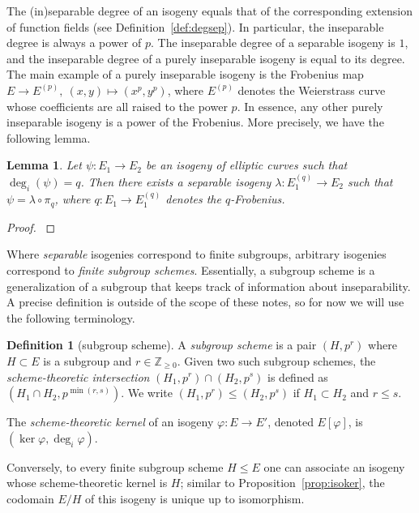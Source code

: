 \documentclass[10pt]{article}
\theoremstyle{plain}
\newtheorem{lemma}[theorem]{Lemma}
\theoremstyle{definition}
\newtheorem{definition}[theorem]{Definition}
\def\Z{\ensuremath{\mathbb{Z}}}
\begin{document}
The (in)separable degree of an isogeny equals that of 
the corresponding extension of function fields
(see Definition~\ref{def:degsep}).
In particular, the inseparable degree is always a power of $p$.
The inseparable degree of a separable isogeny is $1$,
and the inseparable degree of a purely inseparable isogeny is equal
to its degree.
The main example of a purely inseparable isogeny is the Frobenius map
$E\to E^{(p)},\:(x,y)\mapsto (x^p,y^p)$, where $E^{(p)}$ denotes the
Weierstrass curve whose coefficients are all raised to the power $p$.
In essence, any other purely inseparable isogeny is a power of the
Frobenius. More precisely, we have the following lemma.

\begin{lemma}\label{lem:insepdecomp}
    Let $\psi:E_1\to E_2$ be an isogeny of elliptic curves such that
    $\deg_i(\psi)=q$. Then there exists a separable isogeny
    $\lambda:E_1^{(q)}\to E_2$ such that $\psi = \lambda\circ\pi_q$,
    where $q:E_1 \to E_1^{(q)}$ denotes the $q$-Frobenius.
\end{lemma}
\begin{proof}
    \cite[II, Coro.~2.12]{silverman:elliptic}
\end{proof}

Where \emph{separable} isogenies correspond to finite subgroups,
arbitrary isogenies correspond to \emph{finite subgroup schemes}.
Essentially, a subgroup scheme is a generalization of a subgroup that
keeps track of information about inseparability.
A precise definition is outside of the scope of these notes, so for
now we will use the following terminology.

\begin{definition}[subgroup scheme]
A \emph{subgroup scheme} is a pair $(H,p^r)$
where $H\subset E$ is a subgroup and $r\in\Z_{\geq 0}$.
Given two such subgroup schemes, the \emph{scheme-theoretic intersection}
$(H_1,p^r)\cap (H_2,p^s)$ is defined as $(H_1\cap H_2, p^{\min(r,s)})$.
We write $(H_1,p^r)\leq (H_2,p^s)$ if $H_1\subset H_2$ and $r\leq s$.

The \emph{scheme-theoretic kernel} of an isogeny $\varphi: E\to E'$,
denoted $E[\varphi]$, is $(\ker\varphi,\deg_i\varphi)$.
\end{definition}

Conversely, to every finite subgroup scheme $H\leq E$
one can associate an isogeny whose scheme-theoretic kernel is $H$;
similar to Proposition~\ref{prop:isoker}, the codomain $E/H$
of this isogeny is unique up to isomorphism.
\end{document}
